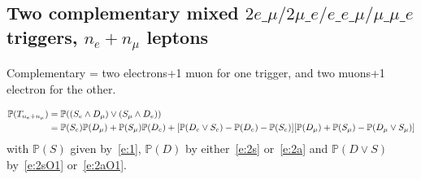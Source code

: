 \documentclass{article}
\newcommand{\pro}{\ensuremath{\mathbb{P}}}
\begin{document}
\subsection{Two complementary mixed $2e\_\mu/2\mu\_e/e\_e\_\mu/\mu\_\mu\_e$ triggers, $n_e+n_\mu$ leptons}

Complementary = two electrons+1 muon for one trigger, and two muons+1 electron for the other. 

\begin{align}
\pro(T_{n_e+n_\mu}) &= \pro((S_e\wedge D_\mu) \vee (S_\mu\wedge D_e))\notag\\
&= \pro(S_e)\pro(D_\mu) + \pro(S_\mu)\pro(D_e) 
+ [\pro(D_e\vee S_e) - \pro(D_e)-\pro(S_e)]
[\pro(D_\mu)+\pro(S_\mu)-\pro(D_\mu\vee S_\mu)]
\end{align}
with $\pro(S)$ given by~\ref{e:1}, $\pro(D)$ by either~\ref{e:2s} or~\ref{e:2a} 
and $\pro(D\vee S)$ by~\ref{e:2sO1} or~\ref{e:2aO1}.
\end{document}
